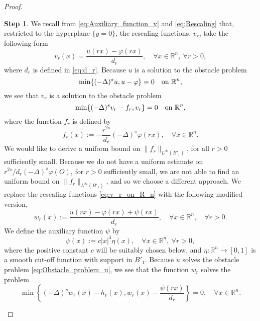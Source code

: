 \documentclass[11pt,reqno]{amsart}
\theoremstyle{definition}
\newtheorem{step}{Step}
\theoremstyle{remark}
\begin{document}
\begin{proof}
\begin{step}
\label{step:Uniform_bound_h_r_w_r}
We recall from \eqref{eq:Auxiliary_function_v} and \eqref{eq:Rescaling} that, restricted to the hyperplane $\{y=0\}$, the rescaling functions, $v_r$, take the following form
\begin{equation}
\label{eq:v_r_on_R_n}
v_r(x)=\frac{u(rx)-\varphi(rx)}{d_r},\quad\forall x\in{\mathbb{R}}^n,\ \forall r>0,
\end{equation}
where $d_r$ is defined in \eqref{eq:d_r}. Because $u$ is a solution to the obstacle problem
\begin{equation}
\label{eq:Obstacle_problem_u}
\min\{(-\Delta)^s u, u-\varphi\}=0\quad\hbox{on }{\mathbb{R}}^n,
\end{equation}
we see that $v_r$ is a solution to the obstacle problem
\begin{equation}
\label{eq:Obstacle_problem_v}
\min\{(-\Delta)^s v_r- f_r, v_r\}=0\quad\hbox{on }{\mathbb{R}}^n,
\end{equation}
where the function $f_r$ is defined by
\begin{equation*}
f_r(x):=-\frac{r^{2s}}{d_r}(-\Delta)^s\varphi(rx),\quad\forall x\in{\mathbb{R}}^n.
\end{equation*}
We would like to derive a uniform bound on $\|f_r\|_{L^{\infty}(B'_1)}$, for all $r>0$ sufficiently small. Because we do not have a uniform estimate on $r^{2s}/d_r(-\Delta)^s\varphi(O)$, for $r>0$ sufficiently small, we are not able to find an uniform bound on $\|f_r\|_{L^{\infty}(B'_1)}$, and so we choose a different approach. 
We replace the rescaling functions \eqref{eq:v_r_on_R_n} with the following modified version,
\begin{equation}
\label{eq:Definition_v_r_modified}
w_r(x):=\frac{u(rx)-\varphi(rx)+\psi(rx)}{d_r},\quad\forall x\in{\mathbb{R}}^n,\quad \forall r>0.
\end{equation}
We define the auxiliary function $\psi$ by
\begin{equation}
\label{eq:Definition_psi_w_r}
\psi(x):=c|x|^4\eta(x),\quad\forall x\in{\mathbb{R}}^n,\ \forall r>0,
\end{equation}
where the positive constant $c$ will be suitably chosen below, and $\eta:{\mathbb{R}}^n\rightarrow [0,1]$ is a smooth cut-off function with support in $B'_1$. Because $u$ solves the obstacle problem \eqref{eq:Obstacle_problem_u}, we see that the function $w_r$ solves the problem 
\begin{equation}
\label{eq:Obstacle_problem_w_r}
\min\left\{(-\Delta)^s w_r(x) - h_r(x), w_r(x)-\frac{\psi(rx)}{d_r}\right\}=0,\quad\forall x\in {\mathbb{R}}^n.

\end{equation}
\end{step}
\end{proof}
\end{document}
